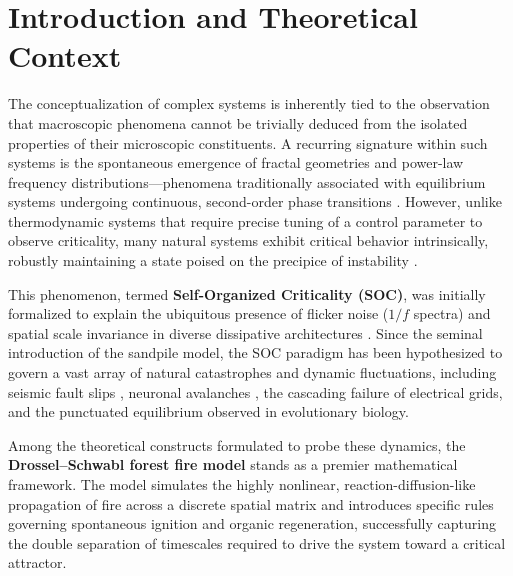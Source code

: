 \documentclass[12pt, a4paper]{article}
\begin{document}
\section{Introduction and Theoretical Context}
\label{sec:intro}

The conceptualization of complex systems is inherently tied to the observation that macroscopic phenomena cannot be trivially deduced from the isolated properties of their microscopic constituents. A recurring signature within such systems is the spontaneous emergence of fractal geometries and power-law frequency distributions---phenomena traditionally associated with equilibrium systems undergoing continuous, second-order phase transitions \citep{bak1996}. However, unlike thermodynamic systems that require precise tuning of a control parameter to observe criticality, many natural systems exhibit critical behavior intrinsically, robustly maintaining a state poised on the precipice of instability \citep{bak1987}.

This phenomenon, termed \textbf{Self-Organized Criticality (SOC)}, was initially formalized to explain the ubiquitous presence of flicker noise ($1/f$ spectra) and spatial scale invariance in diverse dissipative architectures \citep{bak1987}. Since the seminal introduction of the sandpile model, the SOC paradigm has been hypothesized to govern a vast array of natural catastrophes and dynamic fluctuations, including seismic fault slips \citep{olami1992}, neuronal avalanches \citep{beggs2003}, the cascading failure of electrical grids, and the punctuated equilibrium observed in evolutionary biology.

Among the theoretical constructs formulated to probe these dynamics, the \textbf{Drossel--Schwabl forest fire model} \citep{drossel1992} stands as a premier mathematical framework. The model simulates the highly nonlinear, reaction-diffusion-like propagation of fire across a discrete spatial matrix and introduces specific rules governing spontaneous ignition and organic regeneration, successfully capturing the double separation of timescales required to drive the system toward a critical attractor.
\end{document}
